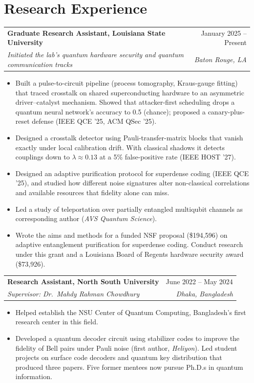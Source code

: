 \documentclass[letterpaper,10pt]{article}
\makeatletter
\newcommand{\entry}[4]{%
  \begin{tabularx}{\textwidth}{@{}X r@{}}
    \textbf{#1} & #2 \\
    \textit{#3} & \textit{#4}
  \end{tabularx}\par}
\makeatother
\begin{document}
\section{Research Experience}
\entry{Graduate Research Assistant, Louisiana State University}{January 2025 -- Present}
      {Initiated the lab's quantum hardware security and quantum communication tracks}{Baton Rouge, LA}
\vspace{-2pt}
\begin{itemize}
  \item Built a pulse-to-circuit pipeline (process tomography, Kraus-gauge fitting) that traced crosstalk on shared superconducting hardware to an asymmetric driver--catalyst mechanism. Showed that attacker-first scheduling drops a quantum neural network's accuracy to 0.5 (chance); proposed a canary-plus-reset defense (IEEE QCE '25, ACM QSec '25).
  \item Designed a crosstalk detector using Pauli-transfer-matrix blocks that vanish exactly under local calibration drift. With classical shadows it detects couplings down to $\lambda \approx 0.13$ at a 5\% false-positive rate (IEEE HOST '27).
  \item Designed an adaptive purification protocol for superdense coding (IEEE QCE '25), and studied how different noise signatures alter non-classical correlations and available resources that fidelity alone can miss.
  \item Led a study of teleportation over partially entangled multiqubit channels as corresponding author (\textit{AVS Quantum Science}).
  \item Wrote the aims and methods for a funded NSF proposal (\$194,596) on adaptive entanglement purification for superdense coding. Conduct research under this grant and a Louisiana Board of Regents hardware security award (\$73,926).
\end{itemize}
\vspace{2pt}
\entry{Research Assistant, North South University}{June 2022 -- May 2024}
      {Supervisor: Dr.~Mahdy Rahman Chowdhury}{Dhaka, Bangladesh}
\vspace{-2pt}
\begin{itemize}
  \item Helped establish the NSU Center of Quantum Computing, Bangladesh's first research center in this field.
  \item Developed a quantum decoder circuit using stabilizer codes to improve the fidelity of Bell pairs under Pauli noise (first author, \textit{Heliyon}). Led student projects on surface code decoders and quantum key distribution that produced three papers. Five former mentees now pursue Ph.D.s in quantum information.
\end{itemize}
\end{document}
